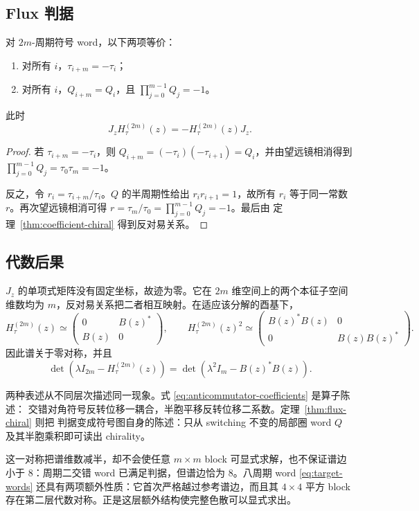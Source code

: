 \subsection{Flux 判据}

\begin{theorem}
\label{thm:flux-chiral}
对 $2m$-周期符号 word，以下两项等价：
\begin{enumerate}
 \item 对所有 $i$，$\tau_{i+m}=-\tau_i$；
 \item 对所有 $i$，$Q_{i+m}=Q_i$，且 $\prod_{j=0}^{m-1}Q_j=-1$。
\end{enumerate}
此时
\begin{equation}
 J_zH_\tau^{(2m)}(z)=-H_\tau^{(2m)}(z)J_z.
 \label{eq:fiber-anticommutation}
\end{equation}
\end{theorem}

\begin{proof}
若 $\tau_{i+m}=-\tau_i$，则
$Q_{i+m}=(-\tau_i)(-\tau_{i+1})=Q_i$，并由望远镜相消得到
$\prod_{j=0}^{m-1}Q_j=\tau_0\tau_m=-1$。

反之，令 $r_i=\tau_{i+m}/\tau_i$。$Q$ 的半周期性给出 $r_ir_{i+1}=1$，故所有
$r_i$ 等于同一常数 $r$。再次望远镜相消可得
$r=\tau_m/\tau_0=\prod_{j=0}^{m-1}Q_j=-1$。最后由
定理~\ref{thm:coefficient-chiral} 得到反对易关系。
\end{proof}

\subsection{代数后果}

$J_z$ 的单项式矩阵没有固定坐标，故迹为零。它在 $2m$ 维空间上的两个本征子空间维数均为
$m$，反对易关系把二者相互映射。在适应该分解的酉基下，
\begin{equation}
 H_\tau^{(2m)}(z)\simeq
 \begin{pmatrix}0&B(z)^*\\B(z)&0\end{pmatrix},\qquad
 H_\tau^{(2m)}(z)^2\simeq
 \begin{pmatrix}B(z)^*B(z)&0\\0&B(z)B(z)^*\end{pmatrix}.
 \label{eq:general-chiral-block}
\end{equation}
因此谱关于零对称，并且
\begin{equation}
 \det(\lambda I_{2m}-H_\tau^{(2m)}(z))
 =\det(\lambda^2I_m-B(z)^*B(z)).
 \label{eq:general-even-characteristic}
\end{equation}

两种表述从不同层次描述同一现象。式 \eqref{eq:anticommutator-coefficients} 是算子陈述：
交错对角符号反转位移一耦合，半胞平移反转位移二系数。定理~\ref{thm:flux-chiral} 则把
判据变成符号图自身的陈述：只从 switching 不变的局部圈 word $Q$ 及其半胞乘积即可读出
chirality。

这一对称把谱维数减半，却不会使任意 $m\times m$ block 可显式求解，也不保证谱边小于
$8$：周期二交错 word 已满足判据，但谱边恰为 $8$。八周期 word
\eqref{eq:target-words} 还具有两项额外性质：它首次严格越过参考谱边，而且其
$4\times4$ 平方 block 存在第二层代数对称。正是这层额外结构使完整色散可以显式求出。
